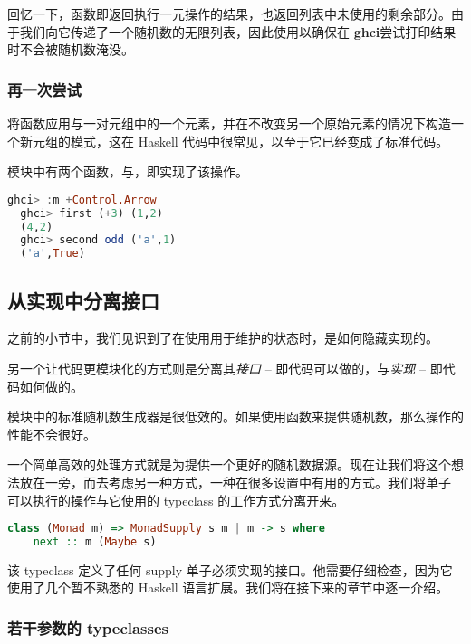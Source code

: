 \documentclass[./main.tex]{subfiles}
\begin{document}
回忆一下，函数即返回执行一元操作的结果，也返回列表中未使用的剩余部分。由于我们向它传递了一个随机数的无限列表，因此使用以确保在
\textbf{ghci}尝试打印结果时不会被随机数淹没。

\subsubsection*{再一次尝试}

将函数应用与一对元组中的一个元素，并在不改变另一个原始元素的情况下构造一个新元组的模式，这在 Haskell 代码中很常见，以至于它已经变成了标准代码。

模块中有两个函数，与，即实现了该操作。

\begin{lstlisting}[language=Haskell]
  ghci> :m +Control.Arrow
  ghci> first (+3) (1,2)
  (4,2)
  ghci> second odd ('a',1)
  ('a',True)
\end{lstlisting}

\subsection*{从实现中分离接口}

之前的小节中，我们见识到了在使用用于维护的状态时，是如何隐藏实现的。

另一个让代码更模块化的方式则是分离其\textit{接口} -- 即代码可以做的，与\textit{实现} -- 即代码如何做的。

模块中的标准随机数生成器是很低效的。如果使用函数来提供随机数，那么操作的性能不会很好。

一个简单高效的处理方式就是为提供一个更好的随机数据源。现在让我们将这个想法放在一旁，而去考虑另一种方式，一种在很多设置中有用的方式。我们将单子
可以执行的操作与它使用的 typeclass 的工作方式分离开来。

\begin{lstlisting}[language=Haskell]
  class (Monad m) => MonadSupply s m | m -> s where
    next :: m (Maybe s)
\end{lstlisting}

该 typeclass 定义了任何 supply 单子必须实现的接口。他需要仔细检查，因为它使用了几个暂不熟悉的 Haskell 语言扩展。我们将在接下来的章节中逐一介绍。

\subsubsection*{若干参数的 typeclasses}
\end{document}
